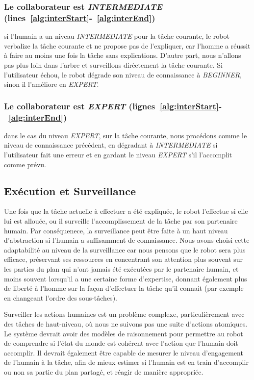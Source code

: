 \documentclass[a4paper,11pt,twoside]{StyleThese}
\begin{document}
\subsubsection{Le collaborateur est \textit{INTERMEDIATE} (lines~\ref{alg:interStart}-~\ref{alg:interEnd})} si l'humain a un niveau  \textit{INTERMEDIATE} pour la tâche courante, le robot verbalize la tâche courante et ne propose pas de l'expliquer, car l'homme a réussit à faire au moins une fois la tâche sans explications. D'autre part, nous n'allons pas plus loin dans l'arbre et surveillons dirèctement la tâche courante. Si l'utilisateur échou, le robot dégrade son niveau de connaissance à \textit{BEGINNER}, sinon il l'améliore en \textit{EXPERT}.

\subsubsection{Le collaborateur est \textit{EXPERT} (lignes~\ref{alg:interStart}-~\ref{alg:interEnd})} dans le cas du niveau \textit{EXPERT}, sur la tâche courante, nous procédons comme le niveau de connaissance précédent, en dégradant à \textit{INTERMEDIATE} si l'utilisateur fait une erreur et en gardant le niveau \textit{EXPERT} s'il l'accomplit comme prévu.

\subsection{Exécution et Surveillance}
Une fois que la tâche actuelle à effectuer a été expliquée, le robot l'effectue si elle lui est allouée, ou il surveille l'accomplissement de la tâche par son partenaire humain. Par conséquenece, la surveillance peut être faite à un haut niveau d'abstraction si l'humain a suffisamment de connaissance.
Nous avons choisi cette adaptabilité au niveau de la surveillance car nous pensons que le robot sera plus efficace, préservant ses ressources en concentrant son attention plus souvent sur les parties du plan qui n'ont jamais été exécutées par le partenaire humain, et moins souvent lorsqu'il a une certaine forme d'expertise, donnant également plus de liberté à l'homme sur la façon d'effectuer la tâche qu'il connait (par exemple en changeant l'ordre des sous-tâches).

Surveiller les actions humaines est un problème complexe, particulièrement avec des tâches de haut-niveau, où nous ne suivons pas une suite d'actions atomiques. Le système devrait avoir des modèles de raisonnement pour permettre au robot de comprendre si l'état du monde est cohérent avec l'action que l'humain doit accomplir. Il devrait également être capable de mesurer le niveau d'engagement de l'humain à la tâche, afin de mieux estimer si l'humain est en train d'accomplir ou non sa partie du plan partagé, et réagir de manière appropriée.
\end{document}
